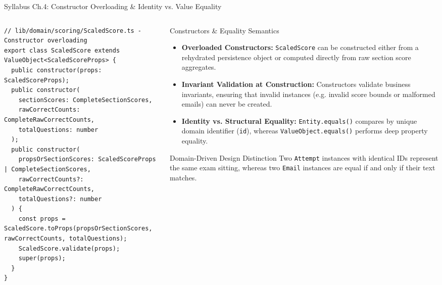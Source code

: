 ﻿\documentclass[aspectratio=169,10pt,t]{beamer}
\begin{document}
\begin{frame}[fragile]{Syllabus Ch.4: Constructor Overloading \& Identity vs. Value Equality}
  \vspace{-1.8mm}
  \begin{columns}[T,onlytextwidth]
    \begin{column}{0.54\textwidth}
      \begin{codeBox}
\begin{lstlisting}
// lib/domain/scoring/ScaledScore.ts - Constructor overloading
export class ScaledScore extends ValueObject<ScaledScoreProps> {
  public constructor(props: ScaledScoreProps);
  public constructor(
    sectionScores: CompleteSectionScores,
    rawCorrectCounts: CompleteRawCorrectCounts,
    totalQuestions: number
  );
  public constructor(
    propsOrSectionScores: ScaledScoreProps | CompleteSectionScores,
    rawCorrectCounts?: CompleteRawCorrectCounts,
    totalQuestions?: number
  ) {
    const props = ScaledScore.toProps(propsOrSectionScores, rawCorrectCounts, totalQuestions);
    ScaledScore.validate(props);
    super(props);
  }
}
\end{lstlisting}
      \end{codeBox}
    \end{column}

    \begin{column}{0.44\textwidth}
      \begin{infoCard}{Constructors \& Equality Semantics}
        \begin{itemize}\setlength{\itemsep}{1.2pt}\setlength{\parskip}{0pt}\setlength{\leftmargini}{7pt}
          \item \textbf{Overloaded Constructors:} \texttt{ScaledScore} can be constructed either from a rehydrated persistence object or computed directly from raw section score aggregates.
          \item \textbf{Invariant Validation at Construction:} Constructors validate business invariants, ensuring that invalid instances (e.g. invalid score bounds or malformed emails) can never be created.
          \item \textbf{Identity vs. Structural Equality:} \texttt{Entity.equals()} compares by unique domain identifier (\texttt{id}), whereas \texttt{ValueObject.equals()} performs deep property equality.
        \end{itemize}
      \end{infoCard}
      \vspace{0.4mm}
      \begin{hlCard}{Domain-Driven Design Distinction}
        \fontsize{5.4pt}{6.4pt}\selectfont
        Two \texttt{Attempt} instances with identical IDs represent the same exam sitting, whereas two \texttt{Email} instances are equal if and only if their text matches.
      \end{hlCard}
    \end{column}
  \end{columns}
\end{frame}
\end{document}
